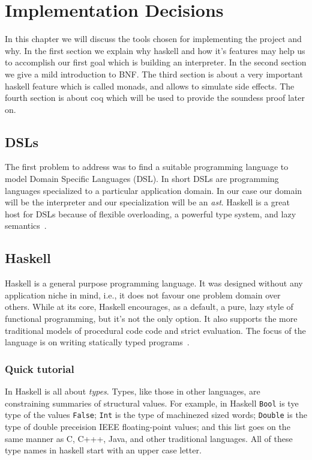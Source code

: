 \chapter{Implementation Decisions}

In this chapter we will discuss the tools chosen for implementing the project
and why. In the first section we explain why haskell and how it's features may
help us to accomplish our first goal which is building an interpreter. In the
second section we give a mild introduction to BNF. The third section is about a
very important haskell feature which is called monads, and allows to simulate
side effects. The fourth section is about coq which will be used to provide the
soundess proof later on.

\section{DSLs}
The first problem to address was to find a suitable programming language to
model Domain Specific Languages (DSL). In short DSLs are programming languages
specialized to a particular application domain. In our case our domain will be
the interpreter and our specialization will be an \textit{ast}. Haskell is a
great host for DSLs because of flexible overloading, a powerful type system,
and lazy semantics~\cite{gill2014domain}. 

\section{Haskell}
Haskell is a general purpose programming language. It was designed without any
application niche in mind, i.e., it does not favour one problem domain over
others. While at its core, Haskell encourages, as a default, a pure, lazy style
of functional programming, but it's not the only option. It also supports the
more traditional models of procedural code code and strict evaluation. The
focus of the language is on writing statically typed programs~\cite{rwhaskell}. 

\subsection{Quick tutorial}
In Haskell is all about \textit{types}. Types, like those in other languages,
are constraining summaries of structural values. For example, in Haskell
\texttt{Bool} is tye type of the values \texttt{False}; \texttt{Int} is the
type of machinezed sized words; \texttt{Double} is the type of double
preceision IEEE floating-point values; and this list goes on the same manner as
C, C+++, Java, and other traditional languages. All of these type names in
haskell start with an upper case letter.

